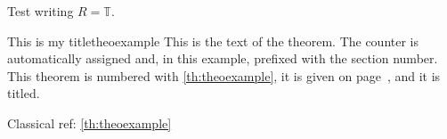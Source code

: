 \documentclass{article}
\begin{document}
Test writing $R = \mathbb{T}$.
\begin{mytheo}{This is my title}{theoexample}\label{TEST : thm}
    This is the text of the theorem. The counter is automatically assigned and,
    in this example, prefixed with the section number. This theorem is numbered with
    \ref{th:theoexample}, it is given on page~\pageref{th:theoexample},
    and it is titled.
    
    Classical ref: \cref{th:theoexample}
\end{mytheo}
\end{document}
